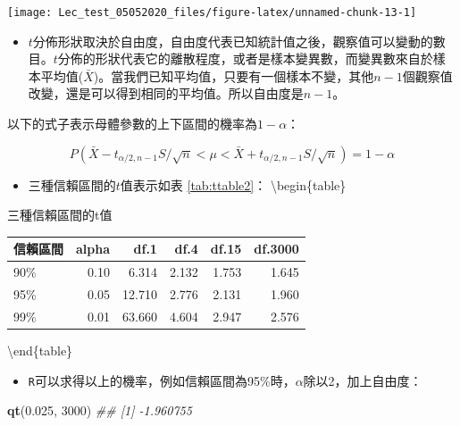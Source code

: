 \documentclass[hyperref,]{ctexart}
\newenvironment{Shaded}{\begin{snugshade}}{\end{snugshade}}
\newcommand{\CommentTok}[1]{\textcolor[rgb]{0.56,0.35,0.01}{\textit{#1}}}
\newcommand{\DecValTok}[1]{\textcolor[rgb]{0.00,0.00,0.81}{#1}}
\newcommand{\FloatTok}[1]{\textcolor[rgb]{0.00,0.00,0.81}{#1}}
\newcommand{\KeywordTok}[1]{\textcolor[rgb]{0.13,0.29,0.53}{\textbf{#1}}}
\newcommand{\NormalTok}[1]{#1}
\providecommand{\tightlist}{%
  \setlength{\itemsep}{0pt}\setlength{\parskip}{0pt}}
\begin{document}
\begin{flushleft}\texttt{[image: Lec\_test\_05052020\_files/figure-latex/unnamed-chunk-13-1]} \end{flushleft}

\begin{itemize}
\tightlist
\item
  \(t\)分佈形狀取決於自由度，自由度代表已知統計值之後，觀察值可以變動的數目。\(t\)分佈的形狀代表它的離散程度，或者是樣本變異數，而變異數來自於樣本平均值(\(\bar{X}\))。當我們已知平均值，只要有一個樣本不變，其他\(n-1\)個觀察值改變，還是可以得到相同的平均值。所以自由度是\(n-1\)。
\end{itemize}

以下的式子表示母體參數的上下區間的機率為\(1-\alpha\)：

\[P(\bar{X}-t_{\alpha/2,n-1}S/\sqrt{n}<\mu<\bar{X}+t_{\alpha/2,n-1}S/\sqrt{n})=1-\alpha\]

\begin{itemize}
\tightlist
\item
  三種信賴區間的\(t\)值表示如表 \ref{tab:ttable2}：
  \textbackslash begin\{table\}
\end{itemize}

\caption{\label{tab:ttable2}三種信賴區間的t值}
\centering
\fontsize{14}{16}\selectfont
\begin{tabular}[t]{lrrrrr}
\toprule
信賴區間 & alpha & df.1 & df.4 & df.15 & df.3000\\
\midrule
90\% & 0.10 & 6.314 & 2.132 & 1.753 & 1.645\\
95\% & 0.05 & 12.710 & 2.776 & 2.131 & 1.960\\
99\% & 0.01 & 63.660 & 4.604 & 2.947 & 2.576\\
\bottomrule
\end{tabular}

\textbackslash end\{table\}

\begin{itemize}
\tightlist
\item
  \texttt{R}可以求得以上的機率，例如信賴區間為95\%時，\(\alpha\)除以2，加上自由度：
\end{itemize}

\begin{Shaded}
\begin{Highlighting}[]
\KeywordTok{qt}\NormalTok{(}\FloatTok{0.025}\NormalTok{, }\DecValTok{3000}\NormalTok{)}
\CommentTok{## [1] -1.960755}
\end{Highlighting}
\end{Shaded}
\end{document}
